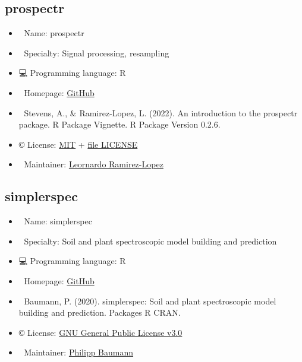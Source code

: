 \documentclass[
  letterpaper,
  DIV=11,
  numbers=noendperiod]{scrreprt}
\providecommand{\tightlist}{%
  \setlength{\itemsep}{0pt}\setlength{\parskip}{0pt}}\usepackage{longtable,booktabs,array}
\begin{document}
\subsection{prospectr}\label{prospectr}

\begin{itemize}
\tightlist
\item
  📛 Name: prospectr\\
\item
  💼 Specialty: Signal processing, resampling\\
\item
  💻 Programming language: R\\
\item
  🔗 Homepage:
  \href{https://github.com/l-ramirez-lopez/prospectr}{GitHub}\\
\item
  📕 Stevens, A., \& Ramirez-Lopez, L. (2022). An introduction to the
  prospectr package. R Package Vignette. R Package Version 0.2.6.\\
\item
  ©️ License: \href{https://cran.r-project.org/web/licenses/MIT}{MIT} +
  \href{https://cran.r-project.org/web/packages/prospectr/LICENSE}{file
  LICENSE}\\
\item
  📧 Maintainer: \href{https://github.com/l-ramirez-lopez}{Leornardo
  Ramirez-Lopez}
\end{itemize}

\subsection{simplerspec}\label{simplerspec}

\begin{itemize}
\tightlist
\item
  📛 Name: simplerspec\\
\item
  💼 Specialty: Soil and plant spectroscopic model building and
  prediction\\
\item
  💻 Programming language: R\\
\item
  🔗 Homepage:
  \href{https://philipp-baumann.github.io/simplerspec}{GitHub}\\
\item
  📕 Baumann, P. (2020). simplerspec: Soil and plant spectroscopic model
  building and prediction. Packages R CRAN.\\
\item
  ©️ License:
  \href{https://github.com/philipp-baumann/simplerspec/blob/master/LICENSE.md}{GNU
  General Public License v3.0}\\
\item
  📧 Maintainer: \href{https://github.com/philipp-baumann}{Philipp
  Baumann}
\end{itemize}
\end{document}
